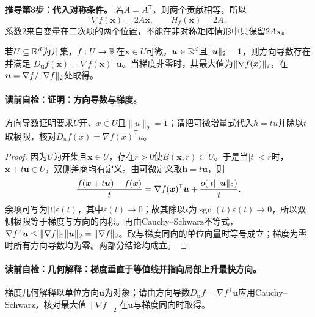 \textbf{推导第3步：代入对称条件。} 若$A=A^{\mathsf T}$，则两个贡献相等，所以
\[
\nabla f(\boldsymbol{x})=2A\boldsymbol{x},\qquad H_f(\boldsymbol{x})=2A.
\]
系数$2$来自变量在二次项的两个位置，不能在非对称矩阵情形中只保留$2A\boldsymbol{x}$。

\begin{theorem}[方向导数与梯度]\label{thm:V1-C03-directional}\label{schema:V1-C03:CH-12}
若$U\subseteq\mathbb{R}^d$为开集，$f:U\to\mathbb{R}$在$\boldsymbol{x}\in U$可微，$\boldsymbol{u}\in\mathbb{R}^d$且$\lVert\boldsymbol{u}\rVert_2=1$，则方向导数存在并满足
$D_{\boldsymbol u}f(\boldsymbol{x})=\nabla f(\boldsymbol{x})^{\mathsf T}\boldsymbol{u}$。当梯度非零时，其最大值为$\lVert\nabla f(\boldsymbol{x})\rVert_2$，在$\boldsymbol u=\nabla f/\lVert\nabla f\rVert_2$处取得。
\end{theorem}
\paragraph{读前自检：证明：方向导数与梯度。}方向导数证明要求$U$开、$x\in U$且$\lVert u\rVert_2=1$；请把可微增量式代入$h=tu$并除以$t$取极限，核对$D_uf(x)=\nabla f(x)^{\mathsf T}u$。\par

\begin{proof}\label{schema:V1-C03:CH-13}
因为$U$为开集且$\boldsymbol{x}\in U$，存在$r>0$使$B(\boldsymbol{x},r)\subset U$。于是当$|t|<r$时，$\boldsymbol{x}+t\boldsymbol u\in U$，双侧差商均有定义。由可微定义取$\boldsymbol{h}=t\boldsymbol{u}$，则
\[
\frac{f(\boldsymbol{x}+t\boldsymbol{u})-f(\boldsymbol{x})}{t}
=\nabla f(\boldsymbol{x})^{\mathsf T}\boldsymbol{u}
+\frac{o(|t|\lVert\boldsymbol u\rVert_2)}{t}.
\]
余项可写为$|t|\varepsilon(t)$，其中$\varepsilon(t)\to0$；故其除以$t$为$\operatorname{sgn}(t)\varepsilon(t)\to0$，所以双侧极限等于梯度与方向的内积。再由Cauchy--Schwarz不等式，
$\nabla f^{\mathsf T}\boldsymbol u\le\lVert\nabla f\rVert_2\lVert\boldsymbol u\rVert_2=\lVert\nabla f\rVert_2$。取与梯度同向的单位向量时等号成立；梯度为零时所有方向导数均为零。两部分结论均成立。
\end{proof}

\paragraph{读前自检：几何解释：梯度垂直于等值线并指向局部上升最快方向。}梯度几何解释以单位方向$\boldsymbol u$为对象；请由方向导数$D_{\boldsymbol u}f=\nabla f^{\mathsf T}\boldsymbol u$应用Cauchy--Schwarz，核对最大值$\lVert\nabla f\rVert_2$在$\boldsymbol u$与梯度同向时取得。\par

